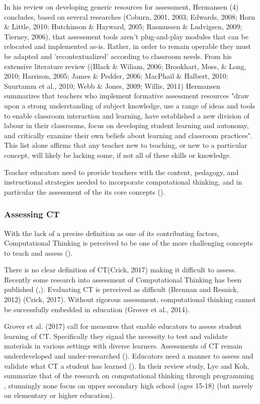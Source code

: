 In his review on developing generic resources for assessment, Hermansen (\cite{hermansen2014reworking}4) concludes, based on several researches (Coburn, 2001, 2003; Edwards, 2008; Horn \& Little, 2010; Hutchinson \& Hayward, 2005; Rasmussen \& Ludvigsen, 2009; Tierney, 2006), that assessment tools aren't plug-and-play modules that can be relocated and implemented as-is. Rather, in order to remain operable they must be adapted and 'recontextualized' according to classroom needs. From his extensive literature review ((Black \& Wiliam, 2006; Brookhart, Moss, \& Long, 2010; Harrison, 2005; James \& Pedder, 2006; MacPhail \& Halbert, 2010; Suurtamm et al., 2010; Webb \& Jones, 2009; Willis, 2011) Hermansen summarizes that teachers who implement formative assessment resources "draw upon a strong understanding of subject knowledge, use a range of ideas and tools to enable classroom interaction and learning, have established a new division of labour in their classrooms, focus on developing student learning and autonomy, and critically examine their own beliefs about learning and classroom practices". This list alone affirms that any teacher new to teaching, or new to a particular concept, will likely be lacking some, if not all of these skills or knowledge.


Teacher educators need to provide teachers with the content, pedagogy, and instructional strategies needed to incorporate computational thinking, and in particular the assessment of the its core concepts (\cite{Yadav2017CTteacherEd}).



\subsubsection*{Assessing CT}
With the lack of a precise definition as one of its contributing factors, Computational Thinking is perceived to be one of the more challenging concepts to teach and assess (\cite{crick2017}).

There is no clear definition of CT(Crick, 2017) making it difficult to assess. Recently some research into assessment of Computational Thinking has been published (\cite{Yadav2017CTteacherEd},\cite{Yadav2016}). Evaluating CT is perceived as difficult (Brennan and Resnick, 2012) (Crick, 2017).
Without rigorous assessment, computational thinking cannot be successfully embedded in education (Grover et al., 2014).

Grover et al. (2017) call for measures that enable educators to assess student learning of CT.  Specifically they signal the necessity to test and validate materials in various settings with diverse learners.
Assessments of CT remain underdeveloped and under-researched (\cite{Yadav2015}).
Educators need a manner to assess and validate what CT a student has learned (\cite{GroverPea2013}).
In their review study, Lye and Koh\cite{LyeKoh2014}, summarize that of the research on computational thinking through programming , stunningly none focus on upper secondary high school (ages 15-18) (but merely on elementary or higher education).


